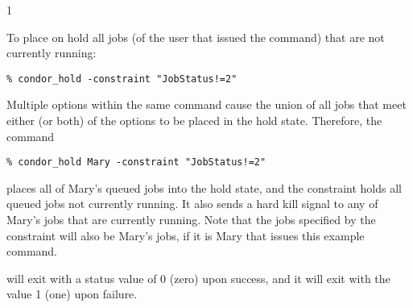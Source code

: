 \begin{ManPage}{\label{man-condor-hold}}{1}
\begin{Options}
\end{Options}

\SeeAlso
{}

\Examples
To place on hold all jobs
(of the user that issued the  command)
that are not currently running:
\footnotesize
\begin{verbatim}
% condor_hold -constraint "JobStatus!=2"
\end{verbatim}
\normalsize

Multiple options within the same command cause the union of 
all jobs that meet either (or both) of the options to be placed in the
hold state.
Therefore, the command
\footnotesize
\begin{verbatim}
% condor_hold Mary -constraint "JobStatus!=2"
\end{verbatim}
\normalsize
places all of Mary's queued jobs into the hold state, 
and the constraint holds all queued jobs not currently running.
It also sends a hard kill signal to any of Mary's jobs that are
currently running.
Note that the jobs specified by the constraint will also be
Mary's jobs, if it is Mary that issues this
example  command.

\ExitStatus

 will exit with a status value of 0 (zero) upon success,
and it will exit with the value 1 (one) upon failure.

\end{ManPage}
